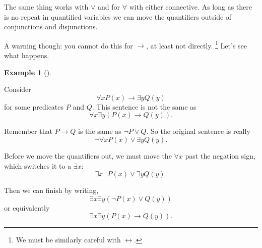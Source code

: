 \documentclass[10pt,]{book}
\theoremstyle{plain}
\theoremstyle{definition}
\newtheorem{example}[theorem]{Example}
\theoremstyle{definition}
\theoremstyle{definition}
\numberwithin{equation}{chapter}
\def\iff{\leftrightarrow}
\def\imp{\rightarrow}
\begin{document}
      The same thing works with \(\vee\) and for \(\forall\) with either connective. As long as there is no repeat in quantified variables we can move the quantifiers outside of conjunctions and disjunctions.
\par

      A warning though: you cannot do this for \(\imp\), at least not directly.
      \footnote{We must be similarly careful with \(\iff\).\label{fn-10}} Let's see what happens.
\begin{example}[]\label{example-88}

          Consider
          \begin{equation*}
            \forall x P(x) \imp \exists y Q(y)
          \end{equation*}
          for some predicates \(P\) and \(Q\). This sentence is not the same as
          \begin{equation*}
            \forall x \exists y (P(x) \imp Q(y)).
          \end{equation*}
\par

          Remember that \(P \imp Q\) is the same as \(\neg P \vee Q\). So the original sentence is really
          \begin{equation*}
            \neg \forall x P(x) \vee \exists y Q(y).
          \end{equation*}
\par

          Before we move the quantifiers out, we must move the \(\forall x\) past the negation sign, which switches it to a \(\exists x\):
          \begin{equation*}
            \exists x \neg P(x) \vee \exists y Q(y).
          \end{equation*}
\par

          Then we can finish by writing,
          \begin{equation*}
            \exists x \exists y (\neg P(x) \vee Q(y))
          \end{equation*}
          or equivalently
          \begin{equation*}
            \exists x \exists y (P(x) \imp Q(y)).
          \end{equation*}
\end{example}
\typeout{************************************************}
\typeout{************************************************}
\end{document}
